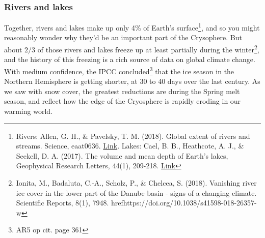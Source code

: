 \subsubsection{Rivers and lakes} Together, rivers and lakes make up only 4\% of Earth's surface\footnote{Rivers: Allen, G. H., \& Pavelsky, T. M. (2018). Global extent of rivers and streams. Science, eaat0636. \href{https://doi.org/10.1126/science.aat0636}{Link}. Lakes: Cael, B. B., Heathcote, A. J., \& Seekell, D. A. (2017). The volume and mean depth of Earth's lakes, Geophysical Research Letters, 44(1), 209-218. \href{https://doi.org/10.1002/2016GL071378}{Link}}, and so you might reasonably wonder why they'd be an important part of the Crysophere. But about $2/3$ of those rivers and lakes freeze up at least partially during the winter\footnote{Ionita, M., Badaluta, C.-A., Scholz, P., \& Chelcea, S. (2018). Vanishing river ice cover in the lower part of the Danube basin - signs of a changing climate. Scientific Reports, 8(1), 7948. href{https://doi.org/10.1038/s41598-018-26357-w}}, and the history of this freezing is a rich source of data on global climate change. With medium confidence, the IPCC concluded\footnote{AR5 op cit. page 361} that the ice season in the Northern Hemisphere is getting shorter, at 30 to 40 days over the last century. As we saw with snow cover, the greatest reductions are during the Spring melt season, and reflect how the edge of the Cryosphere is rapidly eroding in our warming world. 


